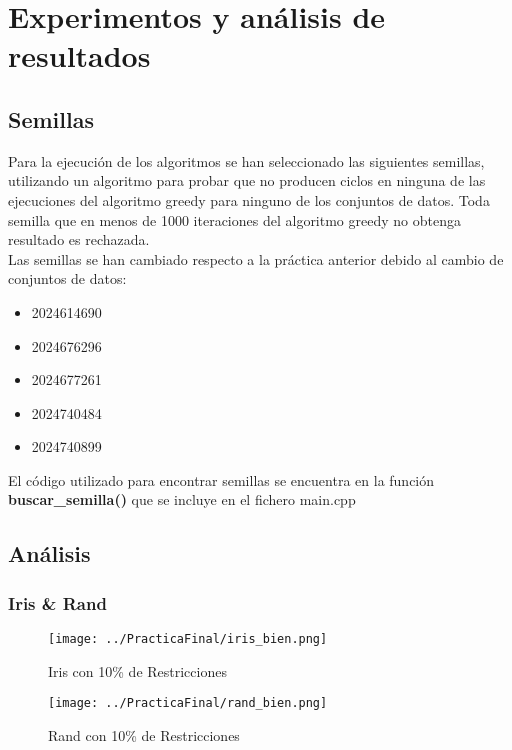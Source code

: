 \chapter{Experimentos y análisis de resultados}
\section{Semillas}
Para la ejecución de los algoritmos se han seleccionado las siguientes semillas, utilizando un algoritmo para probar que no producen ciclos en ninguna de las ejecuciones del algoritmo greedy para ninguno de los conjuntos de datos. Toda semilla que en menos de 1000 iteraciones del algoritmo greedy no obtenga resultado es rechazada. \\
Las semillas se han cambiado respecto a la práctica anterior debido al cambio de conjuntos de datos:
\begin{itemize}
   \item 2024614690
   \item 2024676296
   \item 2024677261
   \item 2024740484
   \item 2024740899
\end{itemize}


El código utilizado para encontrar semillas se encuentra en la función \textbf{buscar\_semilla()} que se incluye en el fichero main.cpp


\section{Análisis}


\subsection{Iris \& Rand}
\begin{figure}[H]
   \centering
   \texttt{[image: ../PracticaFinal/iris\_bien.png]}
   \caption{Iris con 10\% de Restricciones}
\end{figure}

\begin{figure}[H]
   \centering
   \texttt{[image: ../PracticaFinal/rand\_bien.png]}
   \caption{Rand con 10\% de Restricciones}
\end{figure}




